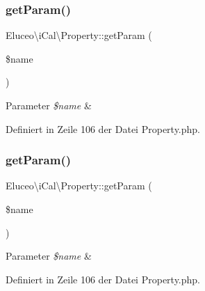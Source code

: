 \subsubsection{\texorpdfstring{get\+Param()}{getParam()}\hspace{0.1cm}{\footnotesize\ttfamily [2/3]}}
{\footnotesize\ttfamily Eluceo\textbackslash{}i\+Cal\textbackslash{}\+Property\+::get\+Param (\begin{DoxyParamCaption}\item[{}]{\$name }\end{DoxyParamCaption})}


\begin{DoxyParams}{Parameter}
{\em \$name} & \\
\hline
\end{DoxyParams}


Definiert in Zeile 106 der Datei Property.\+php.

\mbox{\label{class_eluceo_1_1i_cal_1_1_property_aa0fea66f4397d19a9c553aabd234b26e}} 
\subsubsection{\texorpdfstring{get\+Param()}{getParam()}\hspace{0.1cm}{\footnotesize\ttfamily [3/3]}}
{\footnotesize\ttfamily Eluceo\textbackslash{}i\+Cal\textbackslash{}\+Property\+::get\+Param (\begin{DoxyParamCaption}\item[{}]{\$name }\end{DoxyParamCaption})}


\begin{DoxyParams}{Parameter}
{\em \$name} & \\
\hline
\end{DoxyParams}


Definiert in Zeile 106 der Datei Property.\+php.

\mbox{\label{class_eluceo_1_1i_cal_1_1_property_a2e565cd9324a1f802c741224c9c78864}} 
